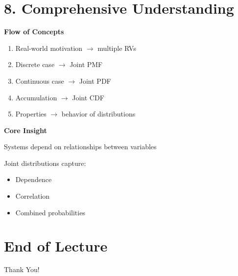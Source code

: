 \documentclass[12pt]{article}
\begin{document}
\section*{8. Comprehensive Understanding}

\textbf{Flow of Concepts}

\begin{enumerate}
\item Real-world motivation $\rightarrow$ multiple RVs
\item Discrete case $\rightarrow$ Joint PMF
\item Continuous case $\rightarrow$ Joint PDF
\item Accumulation $\rightarrow$ Joint CDF
\item Properties $\rightarrow$ behavior of distributions
\end{enumerate}

\textbf{Core Insight}

Systems depend on relationships between variables

Joint distributions capture:
\begin{itemize}
\item Dependence
\item Correlation
\item Combined probabilities
\end{itemize}

\section*{End of Lecture}

Thank You!
\end{document}
